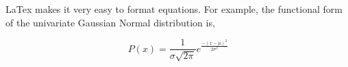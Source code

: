 \documentclass[a4paper]{article}
\begin{document}
  LaTex makes it very easy to format equations. For example, the functional form of the univariate Gaussian Normal distribution is,

  \begin{equation}
P(x) = \frac{1}{\sigma \sqrt {2\pi } }e^{\frac{ - \left( {x - \mu } \right)^2 }{2\sigma^2}}
\label{eq:gaussian}
  \end{equation}





\end{document}
